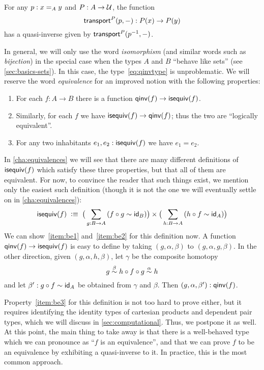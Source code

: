 \begin{eg}\label{thm:transportequiv}
  For any $p:\id[A]xy$ and $P:A\to\type$, the function
  \[\transfib{P}{p}{-}:P(x) \to P(y)\]
  has a quasi-inverse given by $\transfib{P}{\opp p}{-}$.
\end{eg}

In general, we will only use the word \emph{isomorphism} (and similar words such as \emph{bijection}) in the special case when the types $A$ and $B$ ``behave like sets'' (see \autoref{sec:basics-sets}).
In this case, the type~\eqref{eq:qinvtype} is unproblematic.
We will reserve the word \emph{equivalence} for an improved notion with the following properties:%
\begin{enumerate}
\item For each $f:A\to B$ there is a function $\qinv(f) \to \isequiv (f)$.\label{item:be1}
\item Similarly, for each $f$ we have $\isequiv (f) \to \qinv(f)$; thus the two are ``logically equivalent''.\label{item:be2}
\item For any two inhabitants $e_1,e_2:\isequiv(f)$ we have $e_1=e_2$.\label{item:be3}
\end{enumerate}
In \autoref{cha:equivalences} we will see that there are many different definitions of $\isequiv(f)$ which satisfy these three properties, but that all of them are equivalent.
For now, to convince the reader that such things exist, we mention only the easiest such definition (though it is not the one we will eventually settle on in \autoref{cha:equivalences}):
\begin{equation}\label{eq:isequiv-invertible}
  \isequiv(f) \;\defeq\;
  \big(\sm{g:B\to A} (f\circ g \htpy \idfunc[B])\big)
  \times
  \big(\sm{h:B\to A} (h\circ f \htpy \idfunc[A])\big)
\end{equation}
We can show~\ref{item:be1} and~\ref{item:be2} for this definition now.
A function $\qinv(f) \to \isequiv (f)$ is easy to define by taking $(g,\alpha,\beta)$ to $(g,\alpha,g,\beta)$.
In the other direction, given $(g,\alpha,h,\beta)$, let $\gamma$ be the composite homotopy
\[ g \overset{\beta}{\htpy} h\circ f\circ g \overset{\alpha}{\htpy} h \]
and let $\beta':g\circ f\htpy \idfunc[A]$ be obtained from $\gamma$ and $\beta$.
Then $(g,\alpha,\beta'):\qinv(f)$.

Property~\ref{item:be3} for this definition is not too hard to prove either, but it requires identifying the identity types of cartesian products and dependent pair types, which we will discuss in \autoref{sec:computational}.
Thus, we postpone it as well.
At this point, the main thing to take away is that there is a well-behaved type which we can pronounce as ``$f$ is an equivalence'', and that we can prove $f$ to be an equivalence by exhibiting a quasi-inverse to it.
In practice, this is the most common approach.

